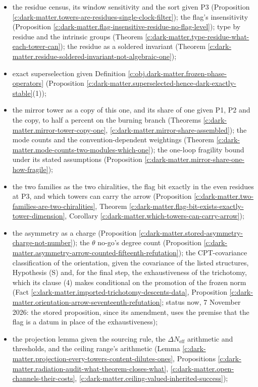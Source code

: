 \documentclass[11pt]{article}
\theoremstyle{definition}
\theoremstyle{plain}
\providecommand{\Neff}{}\renewcommand{\Neff}{N_{\mathrm{eff}}}
\begin{document}
\begin{itemize} 
\item the residue census, its window sensitivity and the sort given P3 (Proposition \ref{c:dark-matter.towers-are-residues-single-clock-filter}); the flag's insensitivity (Proposition \ref{c:dark-matter.flag-insensitive-residue-no-flag-level}); type by residue and the intrinsic groups (Theorem \ref{c:dark-matter.type-residue-what-each-tower-can}); the residue as a soldered invariant (Theorem \ref{c:dark-matter.residue-soldered-invariant-not-algebraic-one});
\item exact superselection given Definition \ref{c:obj.dark-matter.frozen-phase-operators} (Proposition \ref{c:dark-matter.superselected-hence-dark-exactly-stable}(1));
\item the mirror tower as a copy of this one, and its share of one given P1, P2 and the copy, to half a percent on the burning branch (Theorems \ref{c:dark-matter.mirror-tower-copy-one}, \ref{c:dark-matter.mirror-share-assembled}); the mode counts and the convention-dependent weightings (Theorem \ref{c:dark-matter.mode-counts-two-modules-which-one}); the one-loop fragility bound under its stated assumptions (Proposition \ref{c:dark-matter.mirror-share-one-how-fragile});
\item the two families as the two chiralities, the flag bit exactly in the even residues at P3, and which towers can carry the arrow (Proposition \ref{c:dark-matter.two-families-are-two-chiralities}, Theorem \ref{c:dark-matter.flag-bit-exists-exactly-tower-dimension}, Corollary \ref{c:dark-matter.which-towers-can-carry-arrow});
\item the asymmetry as a charge (Proposition \ref{c:dark-matter.stored-asymmetry-charge-not-number}); the $\theta$ no-go's degree count (Proposition \ref{c:dark-matter.asymmetry-arrow-counted-fifteenth-refutation}); the CPT-covariance classification of the orientation, given the covariance of the listed structures, Hypothesis (S) and, for the final step, the exhaustiveness of the trichotomy, which its clause (4) makes conditional on the promotion of the frozen norm (Fact \ref{c:dark-matter.imported-trichotomy-descents-data}, Proposition \ref{c:dark-matter.orientation-arrow-seventeenth-refutation}; status now, 7 November 2026: the stored proposition, since its amendment, uses the premise that the flag is a datum in place of the exhaustiveness);
\item the projection lemma given the sourcing rule, the $\Delta\Neff$ arithmetic and thresholds, and the ceiling range's arithmetic (Lemma \ref{c:dark-matter.projection-every-towers-content-dilutes-ones}, Propositions \ref{c:dark-matter.radiation-audit-what-theorem-closes-what}, \ref{c:dark-matter.open-channels-their-costs}, \ref{c:dark-matter.ceiling-valued-inherited-success});

\end{itemize}
\end{document}
